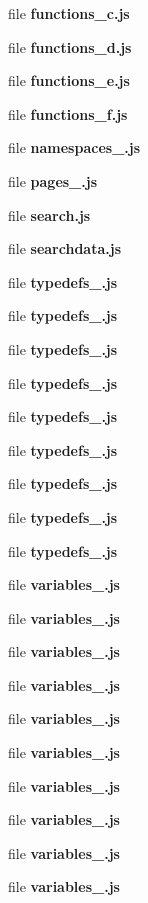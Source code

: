 \begin{DoxyCompactItemize}
\item 
file {\bf functions\+\_\+c.\+js}
\item 
file {\bf functions\+\_\+d.\+js}
\item 
file {\bf functions\+\_\+e.\+js}
\item 
file {\bf functions\+\_\+f.\+js}
\item 
file {\bf namespaces\+\_.\+js}
\item 
file {\bf pages\+\_.\+js}
\item 
file {\bf search.\+js}
\item 
file {\bf searchdata.\+js}
\item 
file {\bf typedefs\+\_.\+js}
\item 
file {\bf typedefs\+\_.\+js}
\item 
file {\bf typedefs\+\_.\+js}
\item 
file {\bf typedefs\+\_.\+js}
\item 
file {\bf typedefs\+\_.\+js}
\item 
file {\bf typedefs\+\_.\+js}
\item 
file {\bf typedefs\+\_.\+js}
\item 
file {\bf typedefs\+\_.\+js}
\item 
file {\bf typedefs\+\_.\+js}
\item 
file {\bf variables\+\_.\+js}
\item 
file {\bf variables\+\_.\+js}
\item 
file {\bf variables\+\_.\+js}
\item 
file {\bf variables\+\_.\+js}
\item 
file {\bf variables\+\_.\+js}
\item 
file {\bf variables\+\_.\+js}
\item 
file {\bf variables\+\_.\+js}
\item 
file {\bf variables\+\_.\+js}
\item 
file {\bf variables\+\_.\+js}
\item 
file {\bf variables\+\_.\+js}
\end{DoxyCompactItemize}
